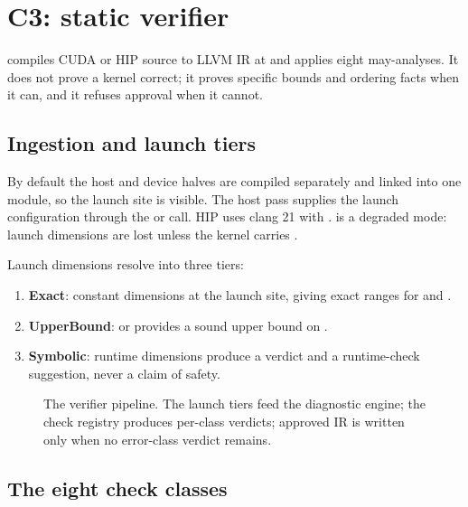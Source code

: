 \section{C3: static verifier}
\label{sec:c3}

 compiles CUDA or HIP source to LLVM IR at 
and applies eight may-analyses. It does not prove a kernel correct; it proves
specific bounds and ordering facts when it can, and it refuses approval when
it cannot.

\subsection{Ingestion and launch tiers}
\label{sec:c3-ingest}

By default the host and device halves are compiled separately and linked into
one module, so the launch site is visible. The host pass supplies the launch
configuration through the  or
 call. HIP uses clang 21 with .
 is a degraded mode: launch dimensions are lost unless the
kernel carries .

Launch dimensions resolve into three tiers:
\begin{enumerate}
  \item \textbf{Exact}: constant dimensions at the launch site, giving exact
        ranges for  and .
  \item \textbf{UpperBound}:  or 
        provides a sound upper bound on .
  \item \textbf{Symbolic}: runtime dimensions produce a 
        verdict and a runtime-check suggestion, never a claim of safety.
\end{enumerate}

\begin{figure}[htbp]
\centering
\resizebox{\textwidth}{!}{}
\caption{The verifier pipeline. The launch tiers feed the diagnostic engine;
the check registry produces per-class verdicts; approved IR is written only
when no error-class verdict remains.}
\label{fig:verify}
\end{figure}

\subsection{The eight check classes}
\label{sec:c3-checks}

